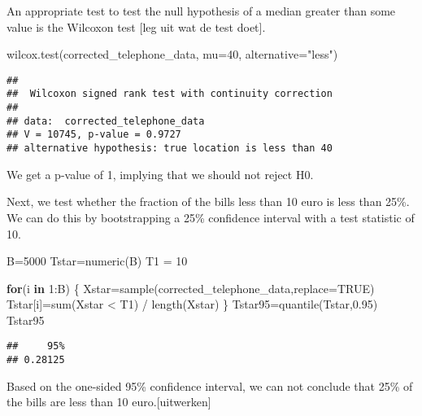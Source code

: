 \documentclass[
]{article}
\newenvironment{Shaded}{\begin{snugshade}}{\end{snugshade}}
\newcommand{\AttributeTok}[1]{\textcolor[rgb]{0.77,0.63,0.00}{#1}}
\newcommand{\ConstantTok}[1]{\textcolor[rgb]{0.00,0.00,0.00}{#1}}
\newcommand{\ControlFlowTok}[1]{\textcolor[rgb]{0.13,0.29,0.53}{\textbf{#1}}}
\newcommand{\DecValTok}[1]{\textcolor[rgb]{0.00,0.00,0.81}{#1}}
\newcommand{\FloatTok}[1]{\textcolor[rgb]{0.00,0.00,0.81}{#1}}
\newcommand{\FunctionTok}[1]{\textcolor[rgb]{0.00,0.00,0.00}{#1}}
\newcommand{\NormalTok}[1]{#1}
\newcommand{\OtherTok}[1]{\textcolor[rgb]{0.56,0.35,0.01}{#1}}
\newcommand{\SpecialCharTok}[1]{\textcolor[rgb]{0.00,0.00,0.00}{#1}}
\newcommand{\StringTok}[1]{\textcolor[rgb]{0.31,0.60,0.02}{#1}}
\begin{document}
An appropriate test to test the null hypothesis of a median greater than
some value is the Wilcoxon test {[}leg uit wat de test doet{]}.

\begin{Shaded}
\begin{Highlighting}[]
\FunctionTok{wilcox.test}\NormalTok{(corrected\_telephone\_data, }\AttributeTok{mu=}\DecValTok{40}\NormalTok{, }\AttributeTok{alternative=}\StringTok{"less"}\NormalTok{)}
\end{Highlighting}
\end{Shaded}

\begin{verbatim}
## 
##  Wilcoxon signed rank test with continuity correction
## 
## data:  corrected_telephone_data
## V = 10745, p-value = 0.9727
## alternative hypothesis: true location is less than 40
\end{verbatim}

We get a p-value of 1, implying that we should not reject H0.

Next, we test whether the fraction of the bills less than 10 euro is
less than 25\%. We can do this by bootstrapping a 25\% confidence
interval with a test statistic of 10.

\begin{Shaded}
\begin{Highlighting}[]
\NormalTok{B}\OtherTok{=}\DecValTok{5000}
\NormalTok{Tstar}\OtherTok{=}\FunctionTok{numeric}\NormalTok{(B)}
\NormalTok{T1 }\OtherTok{=} \DecValTok{10}

\ControlFlowTok{for}\NormalTok{(i }\ControlFlowTok{in} \DecValTok{1}\SpecialCharTok{:}\NormalTok{B) \{}
\NormalTok{  Xstar}\OtherTok{=}\FunctionTok{sample}\NormalTok{(corrected\_telephone\_data,}\AttributeTok{replace=}\ConstantTok{TRUE}\NormalTok{)}
\NormalTok{  Tstar[i]}\OtherTok{=}\FunctionTok{sum}\NormalTok{(Xstar }\SpecialCharTok{\textless{}}\NormalTok{ T1) }\SpecialCharTok{/} \FunctionTok{length}\NormalTok{(Xstar)}
\NormalTok{  \}}
\NormalTok{Tstar95}\OtherTok{=}\FunctionTok{quantile}\NormalTok{(Tstar,}\FloatTok{0.95}\NormalTok{)}
\NormalTok{Tstar95}
\end{Highlighting}
\end{Shaded}

\begin{verbatim}
##     95% 
## 0.28125
\end{verbatim}

Based on the one-sided 95\% confidence interval, we can not conclude
that 25\% of the bills are less than 10 euro.{[}uitwerken{]}
\end{document}
